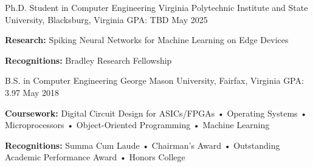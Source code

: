 


\begin{cventries}

\cventry
{Ph.D. Student in Computer Engineering} %
{Virginia Polytechnic Institute and State University, Blacksburg, Virginia} %
{GPA: TBD } %
{May 2025} %
{
\begin{cvitems}
\item {\textbf{Research:} Spiking Neural Networks for Machine Learning on Edge Devices}
\item {\textbf{Recognitions:} Bradley Research Fellowship}
\end{cvitems}
}
\cventry
{B.S. in Computer Engineering} %
{George Mason University, Fairfax, Virginia} %
{GPA: 3.97 } %
{May 2018} %
{
\begin{cvitems}
\item {\textbf{Coursework:} Digital Circuit Design for ASICs/FPGAs • Operating Systems • Microprocessors • Object-Oriented Programming • Machine Learning}
\item {\textbf{Recognitions:} Summa Cum Laude • Chairman's Award • Outstanding Academic Performance Award • Honors College}
\end{cvitems}
}


\end{cventries}